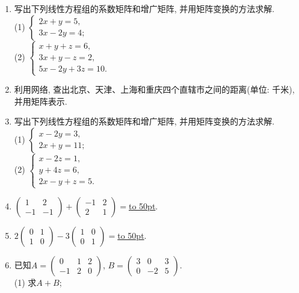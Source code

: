 \documentclass[10pt,a4paper]{article}
\newcommand{\blank}[1]{\underline{\hbox to #1pt{}}}
\begin{document}
\begin{enumerate}[1.]
\item 写出下列线性方程组的系数矩阵和增广矩阵, 并用矩阵变换的方法求解.\\
(1) $\begin{cases}   2x+y=5,  \\3x-2y=4;  \end{cases}$\\
(2) $\begin{cases}   x+y+z=6,  \\3x+y-z=2,  \\5x-2y+3z=10.  \end{cases}$
\item 利用网络, 查出北京、天津、上海和重庆四个直辖市之间的距离(单位: 千米), 并用矩阵表示.
\item 写出下列线性方程组的系数矩阵和增广矩阵, 并用矩阵变换的方法求解.\\
(1) $\begin{cases}    x-2y=3,  \\2x+y=11;  \end{cases}$\\(2) $\begin{cases} x-2z=1,  \\y+4z=6,  \\2x-y+z=5.  \end{cases}$
\item $\begin{pmatrix}    1 & 2  \\-1 & -1  \end{pmatrix}+\begin{pmatrix}    -1 & 2  \\2 & 1  \end{pmatrix}=$\blank{50}.
\item $2\begin{pmatrix}    0 & 1  \\1 & 0  \end{pmatrix}-3\begin{pmatrix}    1 & 0  \\0 & 1  \end{pmatrix}=$\blank{50}.
\item 已知$A=\begin{pmatrix}    0 & 1 & 2  \\-1 & 2 & 0  \end{pmatrix}$, $B=\begin{pmatrix}    3 & 0 & 3  \\0 & -2 & 5  \end{pmatrix}$.\\
(1) 求$A+B$;\\

\end{enumerate}
\end{document}
